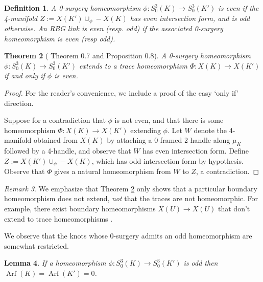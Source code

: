 \documentclass [11pt]{amsart}
\newtheorem {theorem}{Theorem}[section]
\newtheorem {lemma}[theorem]{Lemma}
\newtheorem {definition}[theorem]{Definition}
\theoremstyle{remark}
\newtheorem {remark}[theorem]{Remark}
\def\Arf{\operatorname{Arf}}
\begin{document}
\begin{definition} A 0-surgery homeomorphism $\phi:S^3_0(K)\to S^3_0(K')$ is \emph{even} if the 4-manifold $Z:=X(K')\cup_\phi -X(K)$ has even intersection form, and is \emph{odd} otherwise. An RBG link is \emph{even} (resp. \emph{odd}) if the associated 0-surgery homeomorphism is even (resp odd). 
\end{definition}
\begin{theorem}[\cite{Boyer} Theorem 0.7 and Proposition 0.8]\label{thm:Boyer}
A 0-surgery homeomorphism $\phi:S^3_0(K)\to S^3_0(K')$ extends to a trace homeomorphism $\Phi:X(K)\to X(K')$ if and only if $\phi$ is even. 
\end{theorem}
\begin{proof}
For the reader's convenience, we include a proof of the easy `only if' direction.

Suppose for a contradiction that $\phi$ is not even, and that there is some homeomorphism $\Phi:X(K)\to X(K')$ extending $\phi$. Let $W$ denote the 4-manifold obtained from $X(K)$ by attaching a 0-framed 2-handle along $\mu_K$ followed by a 4-handle, and observe that $W$ has even intersection form. Define $Z:=X(K')\cup_\phi -X(K)$, which has odd intersection form by hypothesis. Observe that $\Phi$ gives a natural homeomorphism from $W$ to $Z$, a contradiction. 
\end{proof}

\begin{remark}
We emphasize that Theorem \ref{thm:Boyer} only shows that a particular boundary homeomorphism does not extend, \emph{not} that the traces are not homeomorphic. For example, there exist  boundary homeomorphisms $X(U)\to X(U)$ that don't extend to trace homeomorphisms \cite{gluck}.
\end{remark}

We observe that the knots whose 0-surgery admits an odd homeomorphism are somewhat restricted.

\begin{lemma}\label{lem:oddArf}
If a homeomorphism $\phi:S^3_0(K)\to S^3_0(K')$ is odd then $\Arf(K)=\Arf(K')=0$.
\end{lemma}
\end{document}
